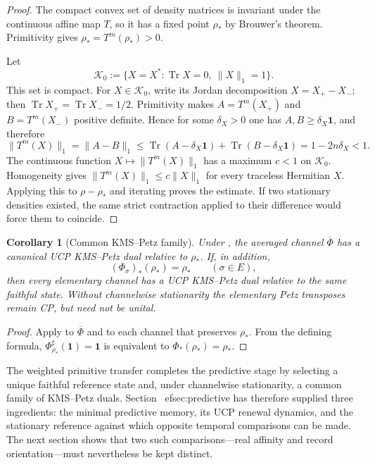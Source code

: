 \documentclass[11pt]{article}
\newtheorem{corollary}[theorem]{Corollary}
\theoremstyle{definition}
\theoremstyle{remark}
\newcommand{\one}{\mathbf 1}
\newcommand{\Tr}{\operatorname{Tr}}
\newcommand{\norm}[1]{\lVert#1\rVert}
\newcommand{\K}{\mathcal K}
\begin{document}
\begin{proof}
The compact convex set of density matrices is invariant under the continuous
affine map $T$, so it has a fixed point $\rho_*$ by Brouwer's theorem.
Primitivity gives $\rho_*=T^m(\rho_*)>0$.

Let
\[
 \K_0:=\{X=X^*: \Tr X=0,\ \norm X_1=1\}.
\]
This set is compact.  For $X\in\K_0$, write its Jordan decomposition
$X=X_+-X_-$; then $\Tr X_+=\Tr X_-=1/2$.  Primitivity makes
$A=T^m(X_+)$ and $B=T^m(X_-)$ positive definite.  Hence for some
$\delta_X>0$ one has $A,B\ge\delta_X\one$, and therefore
\[
 \norm{T^m(X)}_1=\norm{A-B}_1
 \le \Tr(A-\delta_X\one)+\Tr(B-\delta_X\one)
 =1-2n\delta_X<1.
\]
The continuous function $X\mapsto\norm{T^m(X)}_1$ has a maximum $c<1$ on
$\K_0$.  Homogeneity gives
$\norm{T^m(X)}_1\le c\norm X_1$ for every traceless Hermitian $X$.
Applying this to $\rho-\rho_*$ and iterating proves the estimate.  If two
stationary densities existed, the same strict contraction applied to their
difference would force them to coincide.
\end{proof}

\begin{corollary}[Common KMS--Petz family]
\label{cor:common-petz-family}
Under , the averaged channel
$\overline\Phi$ has a canonical UCP KMS--Petz dual relative to $\rho_*$.  If,
in addition,
\[
 (\Phi_\sigma)_*(\rho_*)=\rho_*
 \qquad(\sigma\in E),
\]
then every elementary channel has a UCP KMS--Petz dual relative to the same
faithful state.  Without channelwise stationarity the elementary Petz
transposes remain CP, but need not be unital.
\end{corollary}

\begin{proof}
Apply  to $\overline\Phi$ and to each channel that
preserves $\rho_*$.  From the defining formula,
$\Phi_{\rho_*}^\sharp(\one)=\one$ is equivalent to
$\Phi_*(\rho_*)=\rho_*$.
\end{proof}

The weighted primitive transfer completes the predictive stage by selecting a
unique faithful reference state and, under channelwise stationarity, a common
family of KMS--Petz duals.  Section~
ef{sec:predictive} has therefore supplied
three ingredients: the minimal predictive memory, its UCP renewal dynamics, and
the stationary reference against which opposite temporal comparisons can be
made.  The next section shows that two such comparisons---real affinity and record
orientation---must nevertheless be kept distinct.
\end{document}
